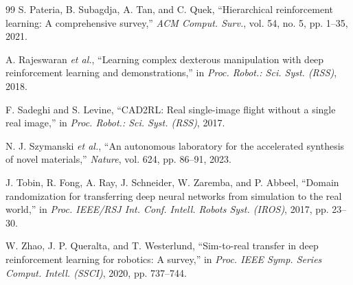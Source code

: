 \documentclass[journal,twocolumn]{IEEEtran}
\begin{document}
\begin{thebibliography}{99}
S. Pateria, B. Subagdja, A. Tan, and C. Quek, ``Hierarchical reinforcement learning: A comprehensive survey,'' \textit{ACM Comput. Surv.}, vol. 54, no. 5, pp. 1--35, 2021.

A. Rajeswaran \textit{et al.}, ``Learning complex dexterous manipulation with deep reinforcement learning and demonstrations,'' in \textit{Proc. Robot.: Sci. Syst. (RSS)}, 2018.

F. Sadeghi and S. Levine, ``CAD2RL: Real single-image flight without a single real image,'' in \textit{Proc. Robot.: Sci. Syst. (RSS)}, 2017.

N. J. Szymanski \textit{et al.}, ``An autonomous laboratory for the accelerated synthesis of novel materials,'' \textit{Nature}, vol. 624, pp. 86--91, 2023.

J. Tobin, R. Fong, A. Ray, J. Schneider, W. Zaremba, and P. Abbeel, ``Domain randomization for transferring deep neural networks from simulation to the real world,'' in \textit{Proc. IEEE/RSJ Int. Conf. Intell. Robots Syst. (IROS)}, 2017, pp. 23--30.

W. Zhao, J. P. Queralta, and T. Westerlund, ``Sim-to-real transfer in deep reinforcement learning for robotics: A survey,'' in \textit{Proc. IEEE Symp. Series Comput. Intell. (SSCI)}, 2020, pp. 737--744.

\end{thebibliography}
\end{document}
